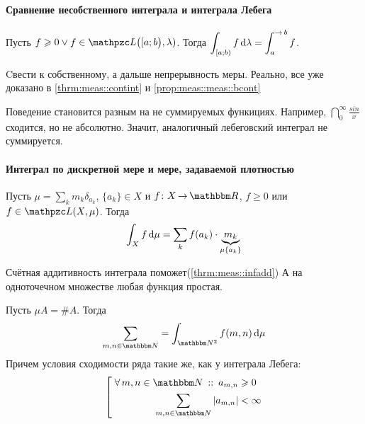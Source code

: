 \documentclass[draft, timbord]{longnotes}
\begin{document}
\paragraph{Сравнение несобственного интеграла и интеграла Лебега}
\label{par:meas::impleb}

\begin{thrm}\label{thrm:meas::impleb}
  Пусть $f \geqslant 0 \lor f \in \summb\bigl([a;b\bigr),\lambda)$. Тогда
  $\displaystyle \int_{[a;b)} f \, \del \lambda = \int _a ^{\to b} f$.
\end{thrm}
\begin{tproof}
  Cвести к собственному, а дальше непрерывность меры.
  Реально, все уже  доказано в \ref{thrm:meas::contint} и \ref{prop:meas::meas::bcont}
\end{tproof}

Поведение становится разным на не суммируемых функициях.
Например, $\dint_0^\infty \frac{sin}{x}$ сходится, но не абсолютно.
Значит, аналогичный лебеговский интеграл не суммируется.

\paragraph{Интеграл по дискретной мере и мере, задаваемой плотностью}
\label{par:meas::discint}

\begin{thrm}\label{thrm:meas::discint::mol}
  Пусть $\mu = \sum_{k} m_k \delta_{a_k}$, $\{a_k\} \in X$ и  $f\colon X \to \R$, 
  $f \geqslant 0$ или $f\in \summb (X,\mu)$.
  Тогда \[
    \int_X f \, \mathrm{d} \mu = \sum_{k} f(a_k) \cdot \underbrace{m_k}_{\mu \{a_k\}}
  \]
\end{thrm}

\begin{tproof}
  Счётная аддитивность интеграла поможет(\ref{thrm:meas::infadd})
  А на одноточечном множестве любая функция простая.
\end{tproof}


\begin{exmp}\label{exmp:meas::discint::series}
  Пусть $\mu A=\#A$. Тогда \[
    \sum_{m,n\in\N} = \int _{\N^2} f(m,n) \, \del \mu
  \]
  Причем условия сходимости  
  ряда такие же, как у интеграла Лебега: 
  \[
    \left[\;
    \begin{aligned}
      \forall\, m,n\in \N \holds a_{m,n} &\geqslant 0 \\
      \sum_{m,n\in\N} |a_{m,n}| &< \infty \\
    \end{aligned} \right.
  \]
\end{exmp}
\end{document}
